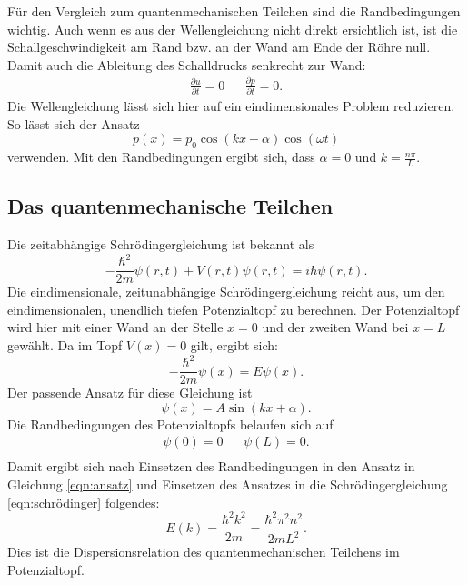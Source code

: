 Für den Vergleich zum quantenmechanischen Teilchen sind die Randbedingungen wichtig.
Auch wenn es aus der Wellengleichung nicht direkt ersichtlich ist, ist die Schallgeschwindigkeit am Rand bzw. an der Wand am Ende der Röhre null.
Damit auch die Ableitung des Schalldrucks senkrecht zur Wand:
\begin{align*}
  \frac{ \partial u }{\partial t} = 0 && \frac{ \partial p }{ \partial t} = 0.
\end{align*}
Die Wellengleichung lässt sich hier auf ein eindimensionales Problem reduzieren.
So lässt sich der Ansatz
\begin{equation*}
  p(x)=p_{0} \cos{(kx + \alpha)} \cos{(\omega t)}
\end{equation*}
verwenden.
Mit den Randbedingungen ergibt sich, dass $\alpha=0$ und $k= \frac{n \pi}{L}$.
%
\subsection{Das quantenmechanische Teilchen}
Die zeitabhängige Schrödingergleichung ist bekannt als
\begin{equation*}
  - \frac{ \hbar^2}{2 m} \psi(r, t) + V(r, t) \psi(r, t) = i \hbar \psi(r, t).
\end{equation*}
Die eindimensionale, zeitunabhängige Schrödingergleichung reicht aus, um den eindimensionalen, unendlich tiefen Potenzialtopf zu berechnen.
Der Potenzialtopf wird hier mit einer Wand an der Stelle $x=0$ und der zweiten Wand bei $x=L$ gewählt.
Da im Topf $V(x)=0$ gilt, ergibt sich:
\begin{equation}
  - \frac{ \hbar^2}{2 m} \psi(x) = E \psi(x).
  \label{eqn:schrödinger}
\end{equation}
Der passende Ansatz für diese Gleichung ist
\begin{equation}
  \psi(x)= A \sin{(kx+\alpha)}.
  \label{eqn:ansatz}
\end{equation}
Die Randbedingungen des Potenzialtopfs belaufen sich auf
\begin{align*}
    \psi(0)=0       && \psi(L)=0.\\
\end{align*}
Damit ergibt sich nach Einsetzen des Randbedingungen in den Ansatz in Gleichung \eqref{eqn:ansatz} und Einsetzen des Ansatzes in die Schrödingergleichung \eqref{eqn:schrödinger} folgendes:
\begin{equation}
  E(k) = \frac{\hbar^2 k^2}{2 m} = \frac{\hbar^2 \pi^2 n^2}{2 m L^2}.
  \label{eqn:dispersionqm}
\end{equation}
Dies ist die Dispersionsrelation des quantenmechanischen Teilchens im Potenzialtopf.
%
